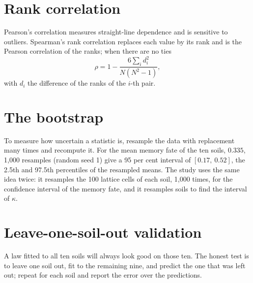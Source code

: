 \section{Rank correlation}\label{ch:rank}
Pearson's correlation measures straight-line dependence and is sensitive to outliers. Spearman's rank correlation replaces each value by its rank and is the Pearson correlation of the ranks; when there are no ties
\begin{equation}\label{eq:spearman}\boxed{\rho=1-\frac{6\sum_i d_i^{2}}{N(N^{2}-1)},}\end{equation}
with $d_i$ the difference of the ranks of the $i$-th pair.
 \finans



\section{The bootstrap}\label{ch:boot}
To measure how uncertain a statistic is, resample the data with replacement many times and recompute it. For the mean memory fate of the ten soils, $0.335$, 1,000 resamples (random seed 1) give a 95 per cent interval of $[0.17,\ 0.52]$, the 2.5th and 97.5th percentiles of the resampled means. The study uses the same idea twice: it resamples the 100 lattice cells of each soil, 1,000 times, for the confidence interval of the memory fate, and it resamples soils to find the interval of $\kappa$.

\section{Leave-one-soil-out validation}\label{ch:loso}
A law fitted to all ten soils will always look good on those ten. The honest test is to leave one soil out, fit to the remaining nine, and predict the one that was left out; repeat for each soil and report the error over the predictions.



